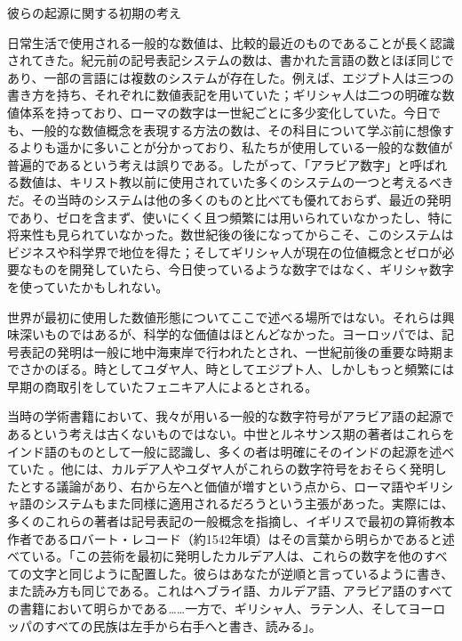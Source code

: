 \documentclass[a4paper,11pt,openany]{ltjsbook}
\begin{document}
彼らの起源に関する初期の考え

日常生活で使用される一般的な数値は、比較的最近のものであることが長く認識されてきた。紀元前の記号表記システムの数は、書かれた言語の数とほぼ同じであり、一部の言語には複数のシステムが存在した。例えば、エジプト人は三つの書き方を持ち、それぞれに数値表記を用いていた；ギリシャ人は二つの明確な数値体系を持っており、ローマの数字は一世紀ごとに多少変化していた。今日でも、一般的な数値概念を表現する方法の数は、その科目について学ぶ前に想像するよりも遥かに多いことが分かっており、私たちが使用している一般的な数値が普遍的であるという考えは誤りである。したがって、「アラビア数字」と呼ばれる数値は、キリスト教以前に使用されていた多くのシステムの一つと考えるべきだ。その当時のシステムは他の多くのものと比べても優れておらず、最近の発明であり、ゼロを含まず、使いにくく且つ頻繁には用いられていなかったし、特に将来性も見られていなかった。数世紀後の後になってからこそ、このシステムはビジネスや科学界で地位を得た；そしてギリシャ人が現在の位値概念とゼロが必要なものを開発していたら、今日使っているような数字ではなく、ギリシャ数字を使っていたかもしれない。

世界が最初に使用した数値形態についてここで述べる場所ではない。それらは興味深いものではあるが、科学的な価値はほとんどなかった。ヨーロッパでは、記号表記の発明は一般に地中海東岸で行われたとされ、一世紀前後の重要な時期までさかのぼる。時としてユダヤ人、時としてエジプト人、しかしもっと頻繁には早期の商取引をしていたフェニキア人によるとされる。

当時の学術書籍において、我々が用いる一般的な数字符号がアラビア語の起源であるという考えは古くないものではない。中世とルネサンス期の著者はこれらをインド語のものとして一般に認識し、多くの者は明確にそのインドの起源を述べていた 。他には、カルデア人やユダヤ人がこれらの数字符号をおそらく発明したとする議論があり、右から左へと価値が増すという点から、ローマ語やギリシャ語のシステムもまた同様に適用されるだろうという主張があった。実際には、多くのこれらの著者は記号表記の一般概念を指摘し、イギリスで最初の算術教本作者であるロバート・レコード（約1542年頃）はその言葉から明らかであると述べている。「この芸術を最初に発明したカルデア人は、これらの数字を他のすべての文字と同じように配置した。彼らはあなたが逆順と言っているように書き、また読み方も同じである。これはヘブライ語、カルデア語、アラビア語のすべての書籍において明らかである……一方で、ギリシャ人、ラテン人、そしてヨーロッパのすべての民族は左手から右手へと書き、読みる」。
\end{document}
